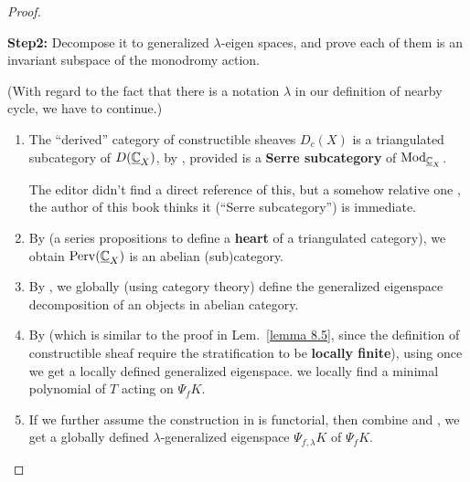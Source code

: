 \begin{proof}
\begin{enumerate}
    \end{enumerate}

    \medskip

    \noindent\textbf{Step2: }Decompose it to generalized $\lambda$-eigen spaces, and prove each of them is an invariant subspace of the monodromy action.

    (With regard to the fact that there is a notation $\lambda$ in our definition of nearby cycle, we have to continue.)

    \begin{enumerate}
        \item The ``derived'' category of constructible sheaves $D_c(X)$ \cite[Definition~4.5.3, Notation~4.5.4]{hotta2008d} is a triangulated subcategory of $D(\underline{\mathbb{C}}_X)$, by \cite[\href{https://stacks.math.columbia.edu/tag/06UP}{06UP}, \href{https://stacks.math.columbia.edu/tag/06UQ}{06UQ}, \href{https://stacks.math.columbia.edu/tag/02MO}{02MO}]{stacks-project},
              provided \cite[Definition~4.5.3]{hotta2008d} is a \textbf{Serre subcategory} of $\mathrm{Mod}_{\underline{\mathbb{C}}_X}$.

              The editor didn't find a direct reference of this, but a somehow relative one \cite[Thm.~8.4.2, Def.~8.4.3 with the discussion below]{KashiwaraSchapira1994Sheaves}, the author of this book thinks it (``Serre subcategory'') is immediate.

        \item By \cite[Def.~4.5.10, Def.~8.1.1, Thm.~8.1.9, Def.~8.1.20, Thm.~8.1.27 and Def.~8.1.28]{KashiwaraSchapira1994Sheaves} (a series propositions to define a \textbf{heart} of a triangulated category), we obtain $\mathrm{Perv}(\underline{\mathbb{C}}_X)$ is an abelian  (sub)category.

        \item By \cite[Lemma~3.2]{Wu2017NearbyVanishingCycles}, we globally (using category theory) define the generalized eigenspace decomposition of an objects in abelian category.

        \item By \cite[Prop~3.3]{Wu2017NearbyVanishingCycles} (which is similar to the proof in Lem.~\ref{lemma 8.5}, since the definition of constructible sheaf require the stratification to be \textbf{locally finite}), using \cite[Lemma~3.2]{Wu2017NearbyVanishingCycles} once we get a locally defined generalized eigenspace.
              we locally find a minimal polynomial of $T$ acting on $\Psi_f K$.

        \item If we further assume the construction in \cite[Lemma~3.2, Not 3.3]{Wu2017NearbyVanishingCycles} is functorial,
              then combine \cite[2.5.1~Thm.]{VakilRisingSea2025} and \cite[Thm.~3.1]{Wu2017NearbyVanishingCycles}, we get a globally defined $\lambda$-generalized eigenspace $\Psi_{f,\lambda} K$ of $\Psi_f K$.
    \end{enumerate}



\end{proof}

